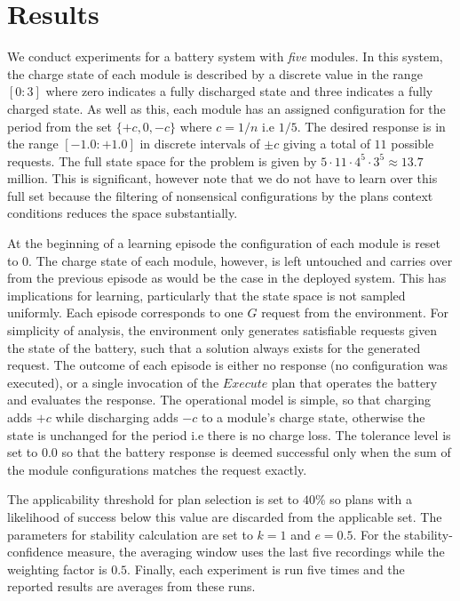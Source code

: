 \section{Results}\label{sec:results}

We conduct experiments for a battery system with {\em five} modules. In this system, the charge state of each module is described by a discrete value in the range $[0:3]$ where zero indicates a fully discharged state and three indicates a fully charged state. As well as this, each module has an assigned configuration for the period from the set $\{+c, 0, -c\}$ where $c=1/n$ i.e $1/5$. The desired response is in the range $[-1.0:+1.0]$ in discrete intervals of $\pm c$ giving a total of $11$ possible requests. The full state space for the problem is given by $5 \cdot 11 \cdot 4^5 \cdot 3^5 \approx 13.7$ million. This is significant, however note that we do not have to learn over this full set because the filtering of nonsensical configurations by the plans context conditions reduces the space substantially.

At the beginning of a learning episode the configuration of each module is reset to $0$. The charge state of each module, however, is left untouched and carries over from the previous episode as would be the case in the deployed system. This has implications for learning, particularly that the state space is not sampled uniformly. Each episode corresponds to one $G$ request from the environment. For simplicity of analysis, the environment only generates satisfiable requests given the state of the battery, such that a solution always exists for the generated request. The outcome of each episode is either no response (no configuration was executed), or a single invocation of the $Execute$ plan that operates the battery and evaluates the response. The operational model is simple, so that charging adds $+c$ while discharging adds $-c$ to a module's charge state, otherwise the state is unchanged for the period i.e there is no charge loss. The tolerance level is set to $0.0$ so that the battery response is deemed successful only when the sum of the module configurations matches the request exactly.

The applicability threshold for plan selection is set to $40\%$ so plans with a likelihood of success below this value are discarded from the applicable set. The parameters for stability calculation are set to $k=1$ and $e=0.5$. For the stability-confidence measure, the averaging window uses the last five recordings while the weighting factor is $0.5$. Finally, each experiment is run five times and the reported results are averages from these runs.

